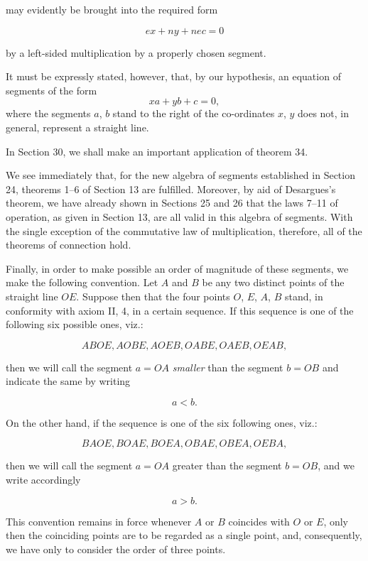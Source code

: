 \documentclass[11pt,oneside]{book}
\begin{document}
may evidently be brought into the required form

\begin{equation}
ex + ny + nec = 0
\end{equation}

by a left-sided multiplication by a properly chosen
segment.

It must be expressly stated, however, that, by our
hypothesis, an equation of segments of the form
\begin{equation}
xa + yb + c = 0,
\end{equation}
where the segments $a$, $b$ stand to the right of the co-ordinates
$x$, $y$ does not, in general, represent a straight
line.

In Section 30, we shall make an important application
of theorem 34.

\label{p28}

We see immediately that, for the new algebra of
segments established in Section 24, theorems 1--6 of Section 13 are
fulfilled.
Moreover, by aid of Desargues's theorem, we have
already shown in Sections 25 and 26 that the laws 7--11 of
operation, as given in Section 13, are all valid in this algebra
of segments. With the single exception of the commutative
law of multiplication, therefore, all of the
theorems of connection hold.

Finally, in order to make possible an order of magnitude
of these segments, we make the following convention.
Let $A$ and $B$ be any two distinct points of
the straight line $OE$. Suppose then that the four
points $O$, $E$, $A$, $B$ stand, in conformity with axiom II,
4, in a certain sequence. If this sequence is one of
the following six possible ones, viz.:

\[ ABOE, AOBE, AOEB, OABE, OAEB, OEAB, \]

then we will call the segment $a = OA$ {\itshape smaller} than the
segment $b = OB$ and indicate the same by writing

\[ a < b. \]

On the other hand, if the sequence is one of the six
following ones, viz.:

\[ BAOE, BOAE, BOEA, OBAE, OBEA, OEBA, \]

then we will call the segment $a = OA$ greater than the
segment $b = OB$, and we write accordingly

\[ a > b. \]

This convention remains in force whenever $A$ or $B$
coincides with $O$ or $E$, only then the coinciding points
are to be regarded as a single point, and, consequently,
we have only to consider the order of three points.
\end{document}
